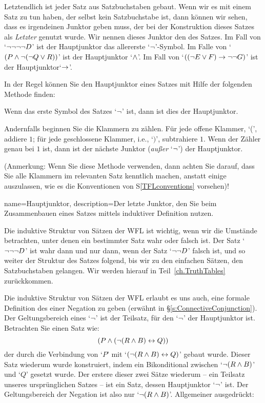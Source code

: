 Letztendlich ist jeder Satz aus Satzbuchstaben gebaut. Wenn wir es mit einem Satz zu tun haben, der selbst kein Satzbuchstabe ist, dann können wir sehen, dass es irgendeinen Junktor geben muss, der bei der Konstruktion dieses Satzes als \emph{Letzter} genutzt wurde. Wir nennen dieses Junktor den  des Satzes. Im Fall von `$\neg\neg\neg\neg D$' ist der Hauptjunktor das allererste `$\neg$'-Symbol. Im Falle von `$(P \wedge \neg (\neg Q \vee R))$' ist der Hauptjunktor `$\wedge$'. Im Fall von `$((\neg E \vee F) \rightarrow \neg \neg G)$' ist der Hauptjunktor`$\rightarrow$'.

In der Regel können Sie den Hauptjunktor eines Satzes mit Hilfe der folgenden Methode finden:
\begin{ebullet}
	\item Wenn das erste Symbol des Satzes `$\neg$' ist, dann ist dies der Hauptjunktor.
	\item Andernfalls beginnen Sie die Klammern zu zählen. Für jede offene Klammer, `(', addiere $1$; für jede geschlossene Klammer, i.e., `$)$', subtrahiere $1$. Wenn der Zähler genau bei $1$ ist, dann ist der nächste Junktor (\emph{au{\ss}er} `$\neg$') der Hauptjunktor.
\end{ebullet}

(Anmerkung: Wenn Sie diese Methode verwenden, dann achten Sie darauf, dass Sie alle Klammern im relevanten Satz kenntlich machen, anstatt einige auszulassen, wie es die Konventionen von S\ref{TFLconventions} vorsehen)!

{
name=Hauptjunktor,
description={Der letzte Junktor, den Sie beim Zusammenbauen eines Satzes mittels induktiver Definition nutzen.}
}

Die induktive Struktur von Sätzen der WFL ist wichtig, wenn wir die Umstände betrachten, unter denen ein bestimmter Satz wahr oder falsch ist. Der Satz `$\neg \neg \neg D$' ist wahr dann und nur dann, wenn der Satz `$\neg \neg D$' falsch ist, und so weiter der Struktur des Satzes folgend, bis wir zu den einfachen Sätzen, den Satzbuchstaben gelangen. Wir werden hierauf in Teil~\ref{ch.TruthTables} zurückkommen.

Die induktive Struktur von Sätzen der WFL erlaubt es uns auch, eine formale Definition des  einer Negation zu geben (erwähnt in \S\ref{s:ConnectiveConjunction}). Der Geltungsbereich eines `$\neg$' ist der Teilsatz, für den `$\neg$' der Hauptjunktor ist. Betrachten Sie einen Satz wie:
$$(P \wedge (\neg (R \wedge B) \leftrightarrow Q))$$
der durch die Verbindung von `$P$' mit `$ (\neg (R \wedge B) \leftrightarrow Q)$' gebaut wurde. Dieser Satz wiederum wurde konstruiert, indem ein Bikonditional zwischen `$\neg (R \wedge B)$' und `$Q$' gesetzt wurde. Der erstere dieser zwei Sätze wiederum -- ein Teilsatz unseres ursprünglichen Satzes -- ist ein Satz, dessen Hauptjunktor `$\neg$' ist. Der Geltungsbereich der Negation ist also nur `$\neg(R \wedge B)$'. Allgemeiner ausgedrückt:

